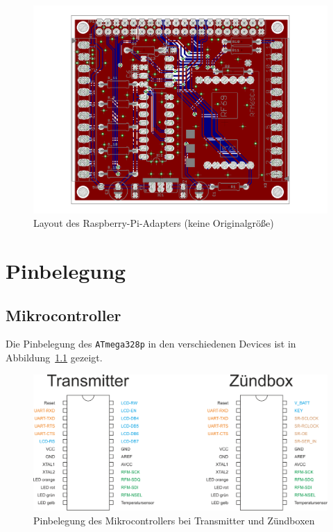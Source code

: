 \documentclass[paper=a4, parskip, numbers=noenddot, toc=listof, headsepline]{scrbook}
\begin{document}
		\begin{figure}
			\centering
			\includegraphics[angle=-90,width=.95\textwidth,keepaspectratio]{Bilder/Piadapterlayout}
			\caption{Layout des Raspberry-Pi-Adapters (keine Originalgröße)}
			\label{fig:piadapterlayout}
		\end{figure}

		\begin{refsection}
			\newrefcontext[sorting=nty]
			\nocite{*} %
			\printbibliography[title=Datenblätter, heading=bibnumbered]
			\label{sec:datasheets}
		\end{refsection}

	\chapter{Pinbelegung}
		\label{ch:pinbelegung}

		\section{Mikrocontroller}
			Die Pinbelegung des \texttt{ATmega328p} in den verschiedenen Devices ist in Abbildung~\ref{fig:pinout} gezeigt.

			\begin{figure}
				\centering
				\includegraphics[width=.7\textwidth]{Bilder/pinout}
				\caption{Pinbelegung des Mikrocontrollers bei Transmitter und Zündboxen}
				\label{fig:pinout}
			\end{figure}
\end{document}
